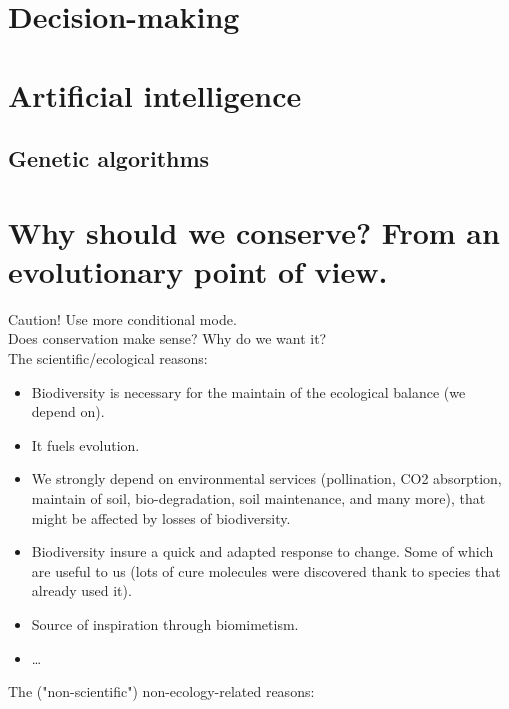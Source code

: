 \documentclass[12pt]{article}
\begin{document}
\section{Decision-making}

\section{Artificial intelligence}

\subsection{Genetic algorithms}

\section{Why should we conserve? From an evolutionary point of view.}
Caution! Use more conditional mode.\\
Does conservation make sense?
Why do we want it?\\
The scientific/ecological reasons:
\begin{itemize}
    \item Biodiversity is necessary for the maintain of the ecological balance (we depend on).
    \item It fuels evolution.
    \item We strongly depend on environmental services (pollination, CO2 absorption, maintain of soil, bio-degradation, soil maintenance, and many more), that might be affected by losses of biodiversity. 
    \item Biodiversity insure a quick and adapted response to change. Some of which are useful to us (lots of cure molecules were discovered thank to species that already used it).
    \item Source of inspiration through biomimetism.
    \item \dots
\end{itemize}
The ("non-scientific") non-ecology-related reasons:
\end{document}
